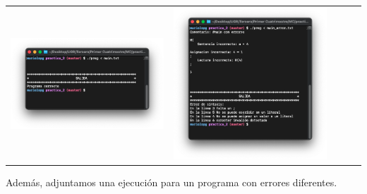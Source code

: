 \begin{table}[H]
	\centering
	\begin{tabular}{lllll}
		\multicolumn{1}{c}{\includegraphics[scale=0.38]{../practica_2/images/main_correcto_ejec.png}} & \multicolumn{1}{c}{\includegraphics[scale=0.38]{../practica_2/images/main_err_ejec.png}}
	\end{tabular}
\end{table}

\newpage

Además, adjuntamos una ejecución para un programa con errores diferentes.

